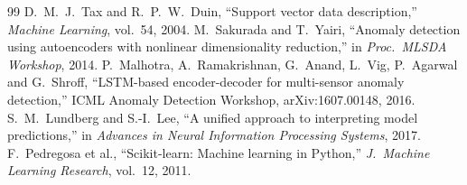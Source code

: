 \documentclass[11pt,a4paper]{article}
\begin{document}
\begin{thebibliography}{99}
 D.~M.~J.~Tax and R.~P.~W.~Duin, ``Support vector data description,'' \emph{Machine Learning}, vol.~54, 2004.
 M.~Sakurada and T.~Yairi, ``Anomaly detection using autoencoders with nonlinear dimensionality reduction,'' in \emph{Proc.\ MLSDA Workshop}, 2014.
 P.~Malhotra, A.~Ramakrishnan, G.~Anand, L.~Vig, P.~Agarwal and G.~Shroff, ``LSTM-based encoder-decoder for multi-sensor anomaly detection,'' ICML Anomaly Detection Workshop, arXiv:1607.00148, 2016.
 S.~M.~Lundberg and S.-I.~Lee, ``A unified approach to interpreting model predictions,'' in \emph{Advances in Neural Information Processing Systems}, 2017.
 F.~Pedregosa et al., ``Scikit-learn: Machine learning in Python,'' \emph{J.\ Machine Learning Research}, vol.~12, 2011.
\end{thebibliography}
\end{document}
